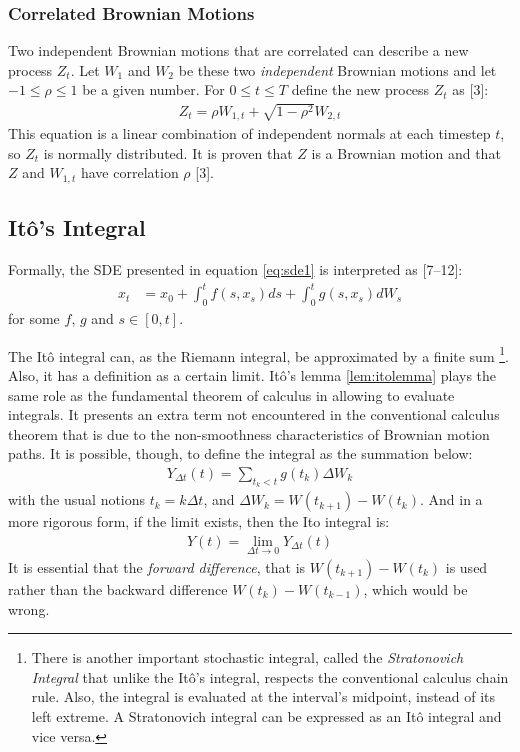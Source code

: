 \documentclass[12pt,twoside]{reedthesis}
\theoremstyle{definition}
\theoremstyle{definition}
\theoremstyle{remark}
\begin{document}
  \subsubsection{Correlated Brownian Motions}\label{corr}
  
  Two independent Brownian motions that are correlated can describe a new
  process \(Z_t\). Let \(W_1\) and \(W_2\) be these two \emph{independent}
  Brownian motions and let \(-1 \leq \rho \leq 1\) be a given number. For
  \(0 \leq t \leq T\) define the new process \(Z_t\) as {[}3{]}:
  \begin{align}
  \label{eq:corr_brow}
  Z_t = \rho W_{1,t} + \sqrt{1-\rho^2}W_{2,t}
  \end{align}
  \noindent
  This equation is a linear combination of independent normals at each
  timestep \(t\), so \(Z_t\) is normally distributed. It is proven that
  \(Z\) is a Brownian motion and that \(Z\) and \(W_{1,t}\) have
  correlation \(\rho\) {[}3{]}.
  
  \subsection{Itô's Integral}\label{itos-integral}
  
  Formally, the SDE presented in equation \eqref{eq:sde1} is interpreted as
  {[}7--12{]}:
  \begin{align} 
  \label{eq:sde2}
  x_t &= x_0 + \int_{0}^{t}{f(s, x_s)ds} + \int_{0}^{t}{g(s, x_s)dW_s}
  \end{align}
  \noindent
  for some \(f\), \(g\) and \(s \in [0,t]\).
  
  The Itô integral can, as the Riemann integral, be approximated by a
  finite sum
  \footnote{There is another important stochastic integral, called the \textit{Stratonovich Integral} that unlike the Itô's integral, respects the conventional calculus chain rule. Also, the integral is evaluated at the interval's midpoint, instead of its left extreme. A Stratonovich integral can be expressed as an Itô integral and vice versa.}.
  Also, it has a definition as a certain limit. Itô's lemma
  \ref{lem:itolemma} plays the same role as the fundamental theorem of
  calculus in allowing to evaluate integrals. It presents an extra term
  not encountered in the conventional calculus theorem that is due to the
  non-smoothness characteristics of Brownian motion paths. It is possible,
  though, to define the integral as the summation below:
  \begin{align}
  Y_{\Delta t}(t) = \sum_{t_k < t}{g(t_k)\Delta W_k}
  \end{align}
  \noindent
  with the usual notions \(t_k = k\Delta t\), and
  \(\Delta W_k = W(t_{k+1})-W(t_k)\). And in a more rigorous form, if the
  limit exists, then the Ito integral is:
  \begin{align}
  Y(t)  = \lim\limits_{\Delta t \to 0} Y_{\Delta t}(t)
  \end{align}
  It is essential that the \emph{forward difference}, that is
  \(W(t_{k+1})-W(t_k)\) is used rather than the backward difference
  \(W(t_{k})-W(t_{k-1})\), which would be wrong.
  
\end{document}
